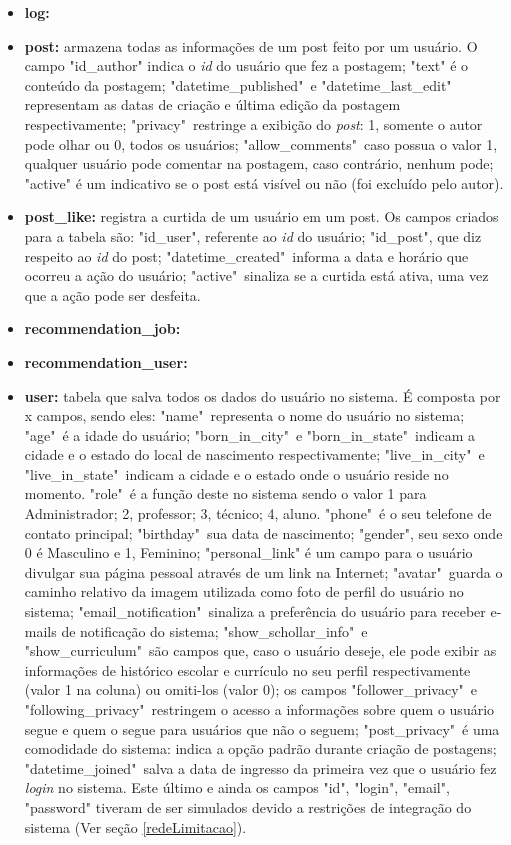 \documentclass[cic,tc]{iiufrgs}
\begin{document}
\begin{itemize}
    \item \textbf{log:}
    
    \item \textbf{post:} armazena todas as informações de um post feito por um usuário. O campo "id\_author" indica o \textit{id} do usuário que fez a postagem; "text" é o conteúdo da postagem; "datetime\_published"\ e "datetime\_last\_edit" representam as datas de criação e última edição da postagem respectivamente; "privacy"\ restringe a exibição do \textit{post}: 1, somente o autor pode olhar ou 0, todos os usuários; "allow\_comments"\ caso possua o valor 1, qualquer usuário pode comentar na postagem, caso contrário, nenhum pode; "active" é um indicativo se o post está visível ou não (foi excluído pelo autor).
    
    \item \textbf{post\_like:} registra a curtida de um usuário em um post. Os campos criados para a tabela são: "id\_user", referente ao \textit{id} do usuário; "id\_post", que diz respeito ao \textit{id} do post; "datetime\_created"\ informa a data e horário que ocorreu a ação do usuário; "active"\ sinaliza se a curtida está ativa, uma vez que a ação pode ser desfeita.
    
    \item \textbf{recommendation\_job:}
    \item \textbf{recommendation\_user:}
    
    \item \textbf{user:} tabela que salva todos os dados do usuário no sistema. É composta por x campos, sendo eles: "name"\ representa o nome do usuário no sistema; "age"\ é a idade do usuário; "born\_in\_city"\ e "born\_in\_state"\ indicam a cidade e o estado do local de nascimento respectivamente; "live\_in\_city"\ e "live\_in\_state"\ indicam a cidade e o estado onde o usuário reside no momento. "role"\ é a função deste no sistema sendo o valor 1 para Administrador; 2, professor; 3, técnico; 4, aluno. "phone"\ é o seu telefone de contato principal; "birthday"\ sua data de nascimento; "gender", seu sexo onde 0 é Masculino e 1, Feminino; "personal\_link" é um campo para o usuário divulgar sua página pessoal através de um link na Internet; "avatar"\ guarda o caminho relativo da imagem utilizada como foto de perfil do usuário no sistema; "email\_notification"\ sinaliza a preferência do usuário para receber e-mails de notificação do sistema; "show\_schollar\_info"\ e "show\_curriculum"\ são campos que, caso o usuário deseje, ele pode exibir as informações de histórico escolar e currículo no seu perfil respectivamente (valor 1 na coluna) ou omiti-los (valor 0); os campos "follower\_privacy"\ e "following\_privacy"\ restringem o acesso a informações sobre quem o usuário segue e quem o segue para usuários que não o seguem; "post\_privacy"\ é uma comodidade do sistema: indica a opção padrão durante criação de postagens; "datetime\_joined"\ salva a data de ingresso da primeira vez que o usuário fez \textit{login} no sistema. Este último e ainda os campos "id", "login", "email", "password" tiveram de ser simulados devido a restrições de integração do sistema (Ver seção \ref{redeLimitacao}).
    

\end{itemize}
\end{document}

